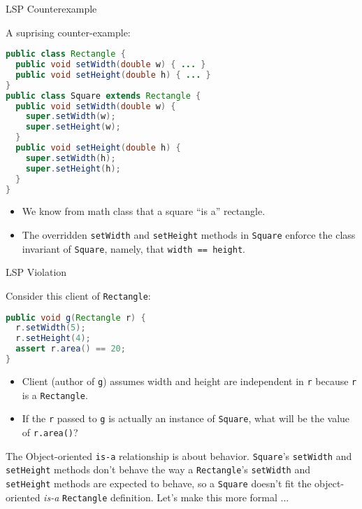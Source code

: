 \documentclass{beamer}
\begin{document}
\begin{frame}[fragile]{LSP Counterexample}

A suprising counter-example:
\vspace{-.05in}
\begin{lstlisting}[language=Java]
public class Rectangle {
  public void setWidth(double w) { ... }
  public void setHeight(double h) { ... }
}
public class Square extends Rectangle {
  public void setWidth(double w) {
    super.setWidth(w);
    super.setHeight(w);
  }
  public void setHeight(double h) {
    super.setWidth(h);
    super.setHeight(h);
  }
}
\end{lstlisting}
\vspace{-.1in}
\begin{itemize}
\item We know from math class that a square ``is a'' rectangle.
\item The overridden {\tt setWidth} and {\tt setHeight} methods in {\tt Square} enforce the class invariant of {\tt Square}, namely, that {\tt width == height}.
\end{itemize}


\end{frame}

\begin{frame}[fragile]{LSP Violation}


Consider this client of {\tt Rectangle}:
\begin{lstlisting}[language=Java]
public void g(Rectangle r) {
  r.setWidth(5);
  r.setHeight(4);
  assert r.area() == 20;
}
\end{lstlisting}

\begin{itemize}
\item Client (author of {\tt g}) assumes width and height are independent in {\tt r} because {\tt r} is a {\tt Rectangle}.
\item If the {\tt r} passed to {\tt g} is actually an instance of {\tt Square}, what will be the value of {\tt r.area()}?
\end{itemize}
The Object-oriented {\tt is-a} relationship is about behavior.  {\tt Square}'s {\tt setWidth} and {\tt setHeight} methods don't behave the way a {\tt Rectangle}'s {\tt setWidth} and {\tt setHeight} methods are expected to behave, so a {\tt Square} doesn't fit the object-oriented {\it is-a} {\tt Rectangle} definition.  Let's make this more formal ...

\end{frame}
\end{document}
